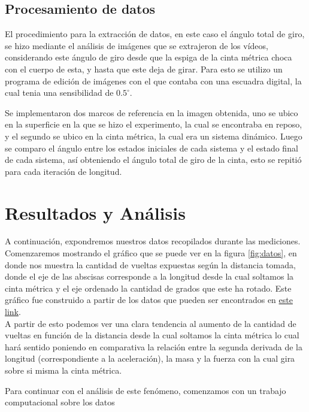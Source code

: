 \documentclass{article}
\begin{document}
\subsection{Procesamiento de datos}
El procedimiento para la extracción de datos, en este caso el ángulo total de giro, se hizo mediante el análisis de imágenes que se extrajeron de los vídeos, considerando este ángulo de giro desde que la espiga de la cinta métrica choca con el cuerpo de esta, y hasta que este deja de girar. Para esto se utilizo un programa de edición de imágenes con el que contaba con una escuadra digital, la cual tenia una sensibilidad de $0.5^{\circ}$. 

\medskip
Se implementaron dos marcos de referencia en la imagen obtenida, uno se ubico en la superficie en la que se hizo el experimento, la cual se encontraba en reposo, y el segundo se ubico en la cinta métrica, la cual era un sistema dinámico. Luego se comparo el ángulo entre los estados iniciales de cada sistema y el estado final de cada sistema, así obteniendo el ángulo total de giro de la cinta, esto se repitió para cada iteración de longitud.

\section{Resultados y Análisis}
A continuación, expondremos nuestros datos recopilados durante las mediciones. Comenzaremos mostrando el gráfico que se puede ver en la figura \ref{fig:datos}, en donde nos muestra la cantidad de vueltas expuestas según la distancia tomada, donde el eje de las abscisas corresponde a la longitud desde la cual soltamos la cinta métrica y el eje ordenado la cantidad de grados que este ha rotado. Este gráfico fue construido a partir de los datos que pueden ser encontrados en \href{https://github.com/ayalin7/El-proyectito/blob/main/graficos/datos/giro.txt}{este link}. \\
A partir de esto podemos ver una clara tendencia al aumento de la cantidad de vueltas en función de la distancia desde la cual soltamos la cinta métrica lo cual hará sentido poniendo en comparativa la relación entre la segunda derivada de la longitud (correspondiente a la aceleración), la masa y la fuerza con la cual gira sobre si misma la cinta métrica. 

Para continuar con el análisis de este fenómeno, comenzamos con un trabajo computacional sobre los datos

\end{document}
